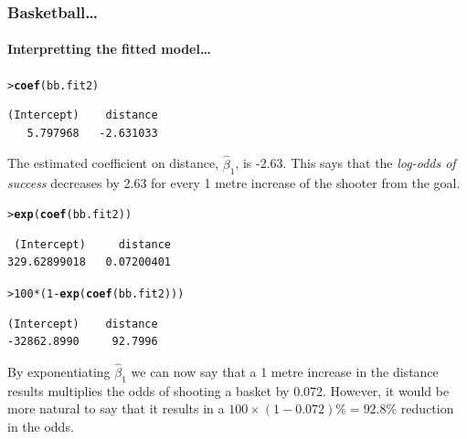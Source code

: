 \documentclass{beamer}\usepackage[]{graphicx}\usepackage[]{xcolor}
\makeatletter
\newcommand{\hlnum}[1]{\textcolor[rgb]{0.686,0.059,0.569}{#1}}%
\newcommand{\hlopt}[1]{\textcolor[rgb]{0,0,0}{#1}}%
\newcommand{\hlstd}[1]{\textcolor[rgb]{0.345,0.345,0.345}{#1}}%
\newcommand{\hlkwd}[1]{\textcolor[rgb]{0.737,0.353,0.396}{\textbf{#1}}}%
\newenvironment{kframe}{%
 \def\at@end@of@kframe{}%
 \ifinner\ifhmode%
  \def\at@end@of@kframe{\end{minipage}}%
  \begin{minipage}{\columnwidth}%
 \fi\fi%
 \def\FrameCommand##1{\hskip\@totalleftmargin \hskip-\fboxsep
 \colorbox{shadecolor}{##1}\hskip-\fboxsep
     \hskip-\linewidth \hskip-\@totalleftmargin \hskip\columnwidth}%
 \MakeFramed {\advance\hsize-\width
   \@totalleftmargin\z@ \linewidth\hsize
   \@setminipage}}%
 {\par\unskip\endMakeFramed%
 \at@end@of@kframe}
\newenvironment{knitrout}{}{} %
\makeatother
\begin{document}
\begin{frame}[fragile]
\frametitle{Basketball\ldots}
\framesubtitle{Interpretting the fitted model\dots}




\begin{knitrout}\scriptsize
{}\color{fgcolor}\begin{kframe}
\begin{alltt}
\hlstd{> }\hlkwd{coef}\hlstd{(bb.fit2)}
\end{alltt}
\begin{verbatim}
(Intercept)    distance 
   5.797968   -2.631033 
\end{verbatim}
\end{kframe}
\end{knitrout}

The estimated coefficient on distance, $\hat\beta_1$, is -2.63. This says that the \emph{log-odds of success} decreases by 2.63 for every 1 metre increase of the shooter from the goal. 

\medskip

\begin{knitrout}\scriptsize
{}\color{fgcolor}\begin{kframe}
\begin{alltt}
\hlstd{> }\hlkwd{exp}\hlstd{(}\hlkwd{coef}\hlstd{(bb.fit2))}
\end{alltt}
\begin{verbatim}
 (Intercept)     distance 
329.62899018   0.07200401 
\end{verbatim}
\begin{alltt}
\hlstd{> }\hlnum{100}\hlopt{*}\hlstd{(}\hlnum{1}\hlopt{-}\hlkwd{exp}\hlstd{(}\hlkwd{coef}\hlstd{(bb.fit2)))}
\end{alltt}
\begin{verbatim}
(Intercept)    distance 
-32862.8990     92.7996 
\end{verbatim}
\end{kframe}
\end{knitrout}


\medskip

By exponentiating $\hat\beta_1$ we can now say that a 1 metre increase in the distance results multiplies the odds of shooting a basket by 0.072. However, it would be more natural to say that it results in a $100\times(1-0.072)\% = 92.8\%$ reduction in the odds. 

\end{frame}
\end{document}

